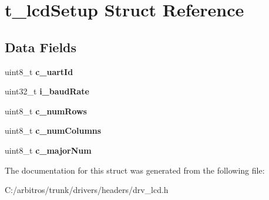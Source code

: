 \hypertarget{structt__lcd_setup}{\section{t\-\_\-lcd\-Setup Struct Reference}
\label{structt__lcd_setup}
}
\subsection*{Data Fields}
\begin{DoxyCompactItemize}
\item 
\hypertarget{structt__lcd_setup_a40f57779b05162e1cea2635c18c6dad9}{uint8\-\_\-t {\bfseries c\-\_\-uart\-Id}}\label{structt__lcd_setup_a40f57779b05162e1cea2635c18c6dad9}

\item 
\hypertarget{structt__lcd_setup_ac316d01a82a05edc681fdfe0bac24060}{uint32\-\_\-t {\bfseries i\-\_\-baud\-Rate}}\label{structt__lcd_setup_ac316d01a82a05edc681fdfe0bac24060}

\item 
\hypertarget{structt__lcd_setup_ad47972fffe115973ae1942366a57aaa5}{uint8\-\_\-t {\bfseries c\-\_\-num\-Rows}}\label{structt__lcd_setup_ad47972fffe115973ae1942366a57aaa5}

\item 
\hypertarget{structt__lcd_setup_a86377dd2d5221b1948156b102aaf117c}{uint8\-\_\-t {\bfseries c\-\_\-num\-Columns}}\label{structt__lcd_setup_a86377dd2d5221b1948156b102aaf117c}

\item 
\hypertarget{structt__lcd_setup_afba9106eb2fa769623759a1b529f884e}{uint8\-\_\-t {\bfseries c\-\_\-major\-Num}}\label{structt__lcd_setup_afba9106eb2fa769623759a1b529f884e}

\end{DoxyCompactItemize}


The documentation for this struct was generated from the following file\-:\begin{DoxyCompactItemize}
\item 
C\-:/arbitros/trunk/drivers/headers/drv\-\_\-lcd.\-h\end{DoxyCompactItemize}
